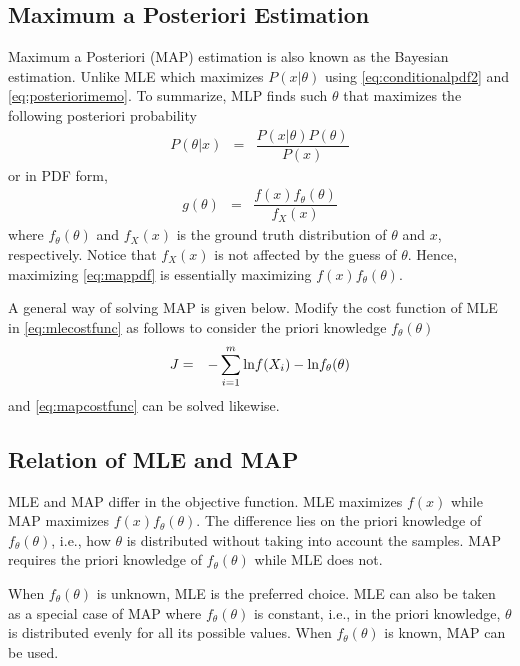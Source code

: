 \subsection{Maximum a Posteriori Estimation}

Maximum a Posteriori (MAP) estimation is also known as the Bayesian estimation. Unlike MLE which maximizes $P(x|\theta)$ using \eqref{eq:conditionalpdf2} and \eqref{eq:posteriorimemo}. To summarize, MLP finds such $\theta$ that maximizes the following posteriori probability
\begin{eqnarray}
	P(\theta|x) &=& \dfrac{P(x|\theta)P(\theta)}{P(x)} \nonumber
\end{eqnarray}
or in PDF form,
\begin{eqnarray}
	g(\theta) &=& \dfrac{f(x)f_{\theta}(\theta)}{f_{X}(x)} \label{eq:mappdf}
\end{eqnarray}
where $f_{\theta}(\theta)$ and $f_{X}(x)$ is the ground truth distribution of $\theta$ and $x$, respectively. Notice that $f_{X}(x)$ is not affected by the guess of $\theta$. Hence, maximizing \eqref{eq:mappdf} is essentially maximizing $f(x)f_{\theta}(\theta)$.

A general way of solving MAP is given below. Modify the cost function of MLE in \eqref{eq:mlecostfunc} as follows to consider the priori knowledge $f_\theta(\theta)$
\begin{eqnarray}
	J &=& -\sum_{i=1}^{m}\textup{ln}f(X_i) - \textup{ln}f_\theta(\theta) \label{eq:mapcostfunc}
\end{eqnarray}
and \eqref{eq:mapcostfunc} can be solved likewise.

\subsection{Relation of MLE and MAP}

MLE and MAP differ in the objective function. MLE maximizes $f(x)$ while MAP maximizes $f(x)f_{\theta}(\theta)$. The difference lies on the priori knowledge of $f_{\theta}(\theta)$, i.e., how $\theta$ is distributed without taking into account the samples. MAP requires the priori knowledge of $f_{\theta}(\theta)$ while MLE does not.

When $f_{\theta}(\theta)$ is unknown, MLE is the preferred choice. MLE can also be taken as a special case of MAP where $f_\theta(\theta)$ is constant, i.e., in the priori knowledge, $\theta$ is distributed evenly for all its possible values. When $f_{\theta}(\theta)$ is known, MAP can be used.

